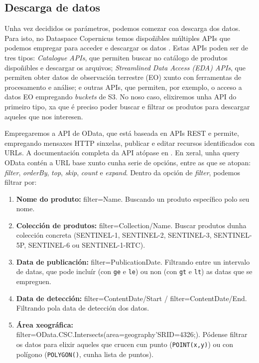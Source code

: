 \subsection{Descarga de datos}\label{appdescarga}
Unha vez decididos os parámetros, podemos comezar coa descarga dos datos. Para isto, no Dataspace Copernicus temos dispoñibles múltiples APIs que podemos empregar para acceder e descargar os datos
. Estas APIs poden ser de tres tipos: \textit{Catalogue APIs}, que permiten buscar no catálogo de produtos dispoñibles e descargar os arquivos; \textit{Streamlined Data Access (EDA) APIs}, que
permiten obter datos de observación terrestre (EO) xunto con ferramentas de procesamento e análise; e outras APIs, que permiten, por exemplo, o acceso a datos EO empregando \textit{buckets} de S3.
No noso caso, elixiremos unha API do primeiro tipo, xa que é preciso poder buscar e filtrar os produtos para descargar aqueles que nos interesen.

Empregaremos a API de OData, que está baseada en APIs REST e permite, empregando mensaxes HTTP sinxelas, publicar e editar recursos identificados con URLs. A documentación completa da API atópase
en \cite{odata}. En xeral, unha query OData contén a URL base xunto cunha serie de opcións, entre as que se atopan: \textit{filter}, \textit{orderBy}, \textit{top}, \textit{skip}, \textit{count} e \textit{expand}.
Dentro da opción de \textit{filter}, podemos filtrar por:
\begin{enumerate}
    \item \textbf{Nome do produto:} filter=Name. Buscando un produto específico polo seu nome.
    \item \textbf{Colección de produtos:} filter=Collection/Name. Buscar produtos dunha colección concreta (SENTINEL-1, SENTINEL-2, SENTINEL-3, SENTINEL-5P, SENTINEL-6 ou SENTINEL-1-RTC).
    \item \textbf{Data de publicación:} filter=PublicationDate. Filtrando entre un intervalo de datas, que pode incluír (con \texttt{ge} e \texttt{le}) ou non (con \texttt{gt} e \texttt{lt}) as datas que se
    empreguen.
    \item \textbf{Data de detección:} filter=ContentDate/Start / filter=ContentDate/End. Filtrando pola data de detección dos datos.
    \item \textbf{Área xeográfica:} filter=OData.CSC.Intersects(area=geography'SRID=4326;). Pódense filtrar os datos para elixir aqueles que crucen cun punto (\texttt{POINT(x,y)}) ou con polígono (\texttt{POLYGON()},
    cunha lista de puntos).
\end{enumerate}

